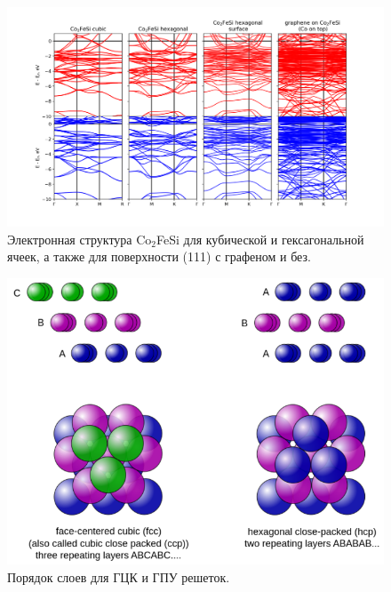 \documentclass[]{article}
\begin{document}
\begin{figure}[h]
    \centering
    \includegraphics[scale=0.65]{images/070920_bands3.png}
    \caption{Электронная структура Co$_2$FeSi для кубической и гексагональной ячеек, а также для поверхности (111) с графеном и без. }
    \label{fig:bands}
\end{figure}

\begin{figure}[h]
    \centering
    \includegraphics[scale=0.4]{images/Closepacking.svg_.png}
    \caption{Порядок слоев для ГЦК и ГПУ решеток. }
    \label{fig:fcc_vs_hcp}
\end{figure}
\end{document}
